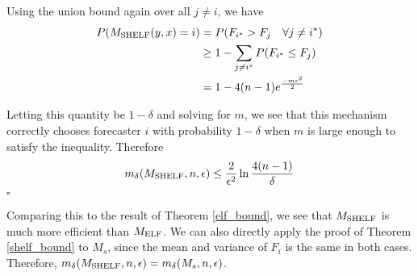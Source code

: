 \documentclass[letterpaper,12pt]{article}
\newcommand{\1}{\mathbbm{1}}
\newcommand*{\QED}{\hfill\ensuremath{\square}}%
\begin{document}
Using the union bound again over all $j \neq i$, we have 
\begin{align*}
  P(M_{\mathrm{SHELF}}(y, x) = i) &= P(F_{i^*} > F_j \quad \forall j \neq i^*) \\
                      &\geq 1 - \sum_{j\neq i^*} P(F_{i^*} \leq F_j) \\
                      &= 1 - 4 (n-1) e^{\frac{- m \epsilon^2}{2}}
\end{align*}

Letting this quantity be $1 - \delta$ and solving for $m$, we see that this mechanism correctly chooses forecaster $i$ with probability $1 - \delta$ when $m$ is large enough to satisfy the inequality. Therefore
\[ m_\delta(M_{\mathrm{SHELF}}, n, \epsilon) \leq \frac{2}{\epsilon^2} \ln \frac{4(n-1)}{\delta} \]
\hfill \QED

Comparing this to the result of Theorem \ref{elf_bound}, we see that $M_{\mathrm{SHELF}}$ is much more efficient than $M_{\mathrm{ELF}}$. We can also directly apply the proof of Theorem \ref{shelf_bound} to $M_s$, since the mean and variance of $F_i$ is the same in both cases. Therefore, $m_\delta(M_{\mathrm{SHELF}}, n, \epsilon) = m_\delta(M_s, n, \epsilon)$. 




%
\end{document}
